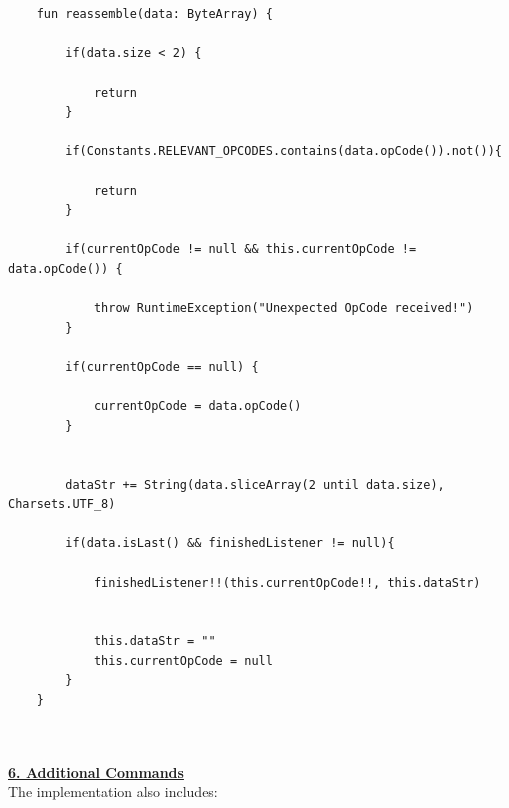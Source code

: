 {{	\mbox{}\\
	\mbox{}\\
	\mbox{}\\
	\mbox{}\\
	\mbox{}\\
	\mbox{}\\
	\mbox{}\\
	\mbox{}\\
	\mbox{}\\
	\mbox{}\\
	\mbox{}\\
	\mbox{}\\
	\mbox{}\\
	\mbox{}\\
	\mbox{}\\
	\mbox{}\\
	\mbox{}\\
	\begin{lstlisting}[label={fig:simpleSourceGen.cs}, caption={Packet reassembler  code}]
		
		
	fun reassemble(data: ByteArray) {
		
		if(data.size < 2) {
			
			return
		}
		
		if(Constants.RELEVANT_OPCODES.contains(data.opCode()).not()){
			
			return
		}
		
		if(currentOpCode != null && this.currentOpCode != data.opCode()) {
			
			throw RuntimeException("Unexpected OpCode received!")
		}
		
		if(currentOpCode == null) {
			
			currentOpCode = data.opCode()
		}
		
		
		dataStr += String(data.sliceArray(2 until data.size), Charsets.UTF_8)
		
		if(data.isLast() && finishedListener != null){
			
			finishedListener!!(this.currentOpCode!!, this.dataStr)
			
			
			this.dataStr = ""
			this.currentOpCode = null
		}
	}
	\end{lstlisting}
	
	
	
	\mbox{}\\
	\mbox{}\\
	
	\textbf{\underline{6. Additional Commands}}\mbox{}\\
	The implementation also includes:
	
}}
